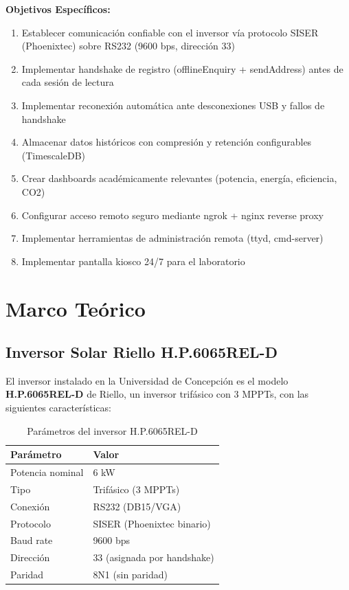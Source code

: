 \documentclass[12pt,a4paper]{article}
\begin{document}
\textbf{Objetivos Espec\'ificos:}
\begin{enumerate}
    \item Establecer comunicaci\'on confiable con el inversor v\'ia protocolo SISER (Phoenixtec) sobre RS232 (9600 bps, direcci\'on 33)
    \item Implementar handshake de registro (offlineEnquiry + sendAddress) antes de cada sesi\'on de lectura
    \item Implementar reconexi\'on autom\'atica ante desconexiones USB y fallos de handshake
    \item Almacenar datos hist\'oricos con compresi\'on y retenci\'on configurables (TimescaleDB)
    \item Crear dashboards acad\'emicamente relevantes (potencia, energ\'ia, eficiencia, CO2)
    \item Configurar acceso remoto seguro mediante ngrok + nginx reverse proxy
    \item Implementar herramientas de administraci\'on remota (ttyd, cmd-server)
    \item Implementar pantalla kiosco 24/7 para el laboratorio
\end{enumerate}

\section{Marco Te\'orico}

\subsection{Inversor Solar Riello H.P.6065REL-D}

El inversor instalado en la Universidad de Concepci\'on es el modelo \textbf{H.P.6065REL-D} de Riello, un inversor trif\'asico con 3 MPPTs, con las siguientes caracter\'isticas:

\begin{table}[H]
\centering
\begin{tabular}{ll}
\toprule
\textbf{Par\'ametro} & \textbf{Valor} \\
\midrule
Potencia nominal & 6 kW \\
Tipo & Trif\'asico (3 MPPTs) \\
Conexi\'on & RS232 (DB15/VGA) \\
Protocolo & SISER (Phoenixtec binario) \\
Baud rate & 9600 bps \\
Direcci\'on & 33 (asignada por handshake) \\
Paridad & 8N1 (sin paridad) \\
\bottomrule
\end{tabular}
\caption{Par\'ametros del inversor H.P.6065REL-D}
\end{table}
\end{document}
